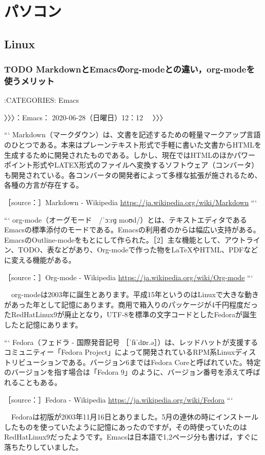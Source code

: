 \documentclass[]{ltjarticle}
\begin{document}
\section{パソコン}
\label{sec:org44452a3}
\subsection{Linux}
\label{sec:orgb569b5e}
\subsubsection{{\bfseries\sffamily TODO} MarkdownとEmacsのorg-modeとの違い，org-modeを使うメリット}
\label{sec:orgc55b176}
:CATEGORIES: Emacs

〉〉〉：Emacs： 2020-06-28（日曜日）12：12　 〉〉〉

```
Markdown（マークダウン）は、文書を記述するための軽量マークアップ言語のひとつである。本来はプレーンテキスト形式で手軽に書いた文書からHTMLを生成するために開発されたものである。しかし、現在ではHTMLのほかパワーポイント形式やLATEX形式のファイルへ変換するソフトウェア（コンバータ）も開発されている。各コンバータの開発者によって多様な拡張が施されるため、各種の方言が存在する。

［source：］Markdown - Wikipedia \url{https://ja.wikipedia.org/wiki/Markdown}
```

```
org-mode（オーグモード　/ˈɔːrɡ moʊd/）とは、テキストエディタであるEmacsの標準添付のモードである。Emacsの利用者のからは幅広い支持がある。EmacsのOutline-modeをもとにして作られた。［2］主な機能として、アウトライン、TODO、表などがあり、Org-modeで作った物を\LaTeX{}やHTML、PDFなどに変える機能がある。

［source：］Org-mode - Wikipedia \url{https://ja.wikipedia.org/wiki/Org-mode}
```

　org-modeは2003年に誕生とあります。平成15年というのはLinuxで大きな動きがあった年として記憶にあります。商用で箱入りのパッケージが4千円程度だったRedHatLinux9が廃止となり，UTF-8を標準の文字コードとしたFedoraが誕生したと記憶にあります。

```
Fedora（フェドラ - 国際発音記号 ［ˈfɨˈdɒr.ə］）は、レッドハットが支援するコミュニティー「Fedora Project」によって開発されているRPM系Linuxディストリビューションである。バージョン6まではFedora Coreと呼ばれていた。特定のバージョンを指す場合は「Fedora 9」のように、バージョン番号を添えて呼ばれることもある。

［source：］Fedora - Wikipedia \url{https://ja.wikipedia.org/wiki/Fedora}
```

　Fedoraは初版が2003年11月16日とありました。5月の連休の時にインストールしたものを使っていたように記憶にあったのですが，その時使っていたのはRedHatLinux9だったようです。Emacsは日本語で1,2ページ分も書けば，すぐに落ちたりしていました。
\end{document}
